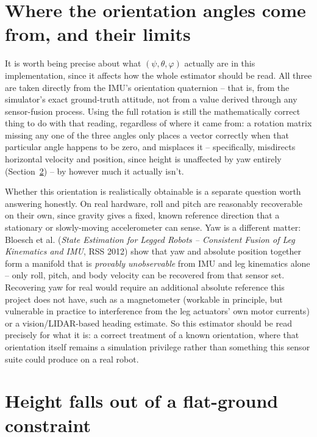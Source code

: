 \documentclass[11pt]{article}
\begin{document}
\section{Where the orientation angles come from, and their limits}
\label{sec:yaw-fix}

It is worth being precise about what $(\psi,\theta,\varphi)$ actually are
in this implementation, since it affects how the whole estimator should be
read. All three are taken directly from the IMU's orientation quaternion --
that is, from the simulator's exact ground-truth attitude, not from a value
derived through any sensor-fusion process. Using the full rotation is
still the mathematically correct thing to do with that reading, regardless
of where it came from: a rotation matrix missing any one of the three
angles only places a vector correctly when that particular angle happens
to be zero, and misplaces it -- specifically, misdirects horizontal
velocity and position, since height is unaffected by yaw entirely
(Section~\ref{sec:height}) -- by however much it actually isn't.

Whether this orientation is realistically obtainable is a separate
question worth answering honestly. On real hardware, roll and pitch are
reasonably recoverable on their own, since gravity gives a fixed, known
reference direction that a stationary or slowly-moving accelerometer can
sense. Yaw is a different matter: Bloesch et al. (\emph{State Estimation
for Legged Robots -- Consistent Fusion of Leg Kinematics and IMU}, RSS
2012) show that yaw and absolute position together form a manifold that is
\emph{provably unobservable} from IMU and leg kinematics alone -- only
roll, pitch, and body velocity can be recovered from that sensor set.
Recovering yaw for real would require an additional absolute reference this
project does not have, such as a magnetometer (workable in principle, but
vulnerable in practice to interference from the leg actuators' own motor
currents) or a vision/LIDAR-based heading estimate. So this estimator
should be read precisely for what it is: a correct treatment of a known
orientation, where that orientation itself remains a simulation privilege
rather than something this sensor suite could produce on a real robot.

\section{Height falls out of a flat-ground constraint}
\label{sec:height}
\end{document}
